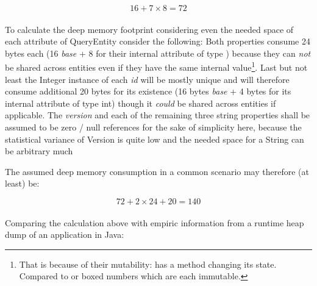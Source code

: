 \[16+7\times8=72\]\\

To calculate the deep memory footprint considering even the needed space of each attribute of QueryEntity consider the following:
Both  properties consume 24 bytes each (16 \textit{base} + 8 for their internal attribute of type ) because they can \emph{not} be shared across entities even if they have the same internal value\footnote{That is because of their mutability:  has a method  changing its state. Compared to  or boxed numbers which are each immutable.}. Last but not least the Integer instance of each \emph{id} will be mostly unique and will therefore consume additional 20 bytes for its existence (16 bytes \textit{base} + 4 bytes for its internal attribute of type int) though it \emph{could} be shared across entities if applicable. The \emph{version} and each of the remaining three string properties shall be assumed to be zero / null references for the sake of simplicity here, because the statistical variance of Version is quite low and the needed space for a String can be arbitrary much\newline

The assumed deep memory consumption in a common scenario may therefore (at least) be:

\[72+2\times24+20=140\]\\

Comparing the calculation above with empiric information from a runtime heap dump of an \AMBETH{} application in Java:

\def\showimgref{img/visualvm-queryentity}

